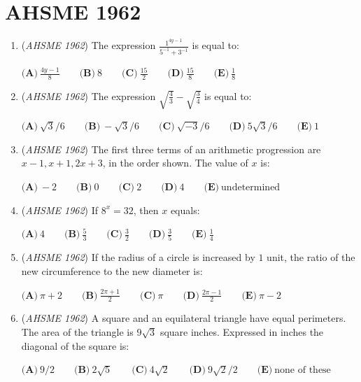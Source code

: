 \section{AHSME 1962}
        \begin{enumerate}
        	\item (\textit{AHSME 1962}) The expression $\frac{1^{4y-1}}{5^{-1}+3^{-1}}$ is equal to:


 $\textbf{(A)}\ \frac{4y-1}{8} \qquad  \textbf{(B)}\ 8 \qquad  \textbf{(C)}\ \frac{15}{2} \qquad  \textbf{(D)}\ \frac{15}{8} \qquad  \textbf{(E)}\ \frac{1}{8}$


	\item (\textit{AHSME 1962}) The expression $\sqrt{\frac{4}{3}} - \sqrt{\frac{3}{4}}$ is equal to:


 $\textbf{(A)}\ \sqrt{3}/6 \qquad  \textbf{(B)}\ -\sqrt{3}/6 \qquad  \textbf{(C)}\ \sqrt{-3}/6 \qquad  \textbf{(D)}\ 5\sqrt{3}/6 \qquad  \textbf{(E)}\ 1$


	\item (\textit{AHSME 1962}) The first three terms of an arithmetic progression are $x - 1, x + 1, 2x + 3$, in the order shown. The value of $x$ is:


 $\textbf{(A)}\ -2 \qquad  \textbf{(B)}\ 0 \qquad  \textbf{(C)}\ 2 \qquad  \textbf{(D)}\ 4 \qquad  \textbf{(E)}\ \text{undetermined}$


	\item (\textit{AHSME 1962}) If $8^x = 32$, then $x$ equals:


 $\textbf{(A)}\ 4 \qquad  \textbf{(B)}\ \frac{5}{3} \qquad  \textbf{(C)}\ \frac{3}{2} \qquad  \textbf{(D)}\ \frac{3}{5} \qquad  \textbf{(E)}\ \frac{1}{4}$


	\item (\textit{AHSME 1962}) If the radius of a circle is increased by $1$ unit, the ratio of the new circumference to the new diameter is:


 $\textbf{(A)}\ \pi + 2 \qquad  \textbf{(B)}\ \frac{2\pi + 1}{2} \qquad  \textbf{(C)}\ \pi \qquad  \textbf{(D)}\ \frac{2\pi - 1}{2} \qquad  \textbf{(E)}\ \pi - 2$


	\item (\textit{AHSME 1962}) A square and an equilateral triangle have equal perimeters. The area of the triangle is $9\sqrt{3}$ square inches. Expressed in inches the diagonal of the square is:


 $\textbf{(A)}\ 9/2 \qquad  \textbf{(B)}\ 2\sqrt{5} \qquad  \textbf{(C)}\ 4\sqrt{2} \qquad  \textbf{(D)}\ 9\sqrt{2}/2 \qquad  \textbf{(E)}\ \text{none of these}$



\end{enumerate}

